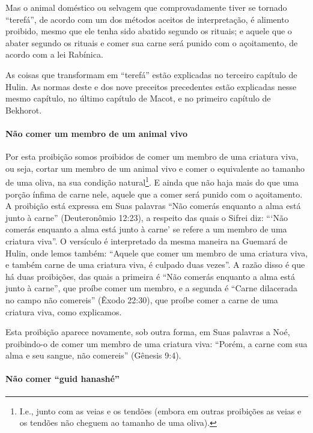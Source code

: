 Mas o animal doméstico ou selvagem que comprovadamente tiver se tornado
``terefá'', de acordo com um dos métodos aceitos de interpretação, é
alimento proibido, mesmo que ele tenha sido abatido segundo os rituais;
e aquele que o abater segundo os rituais e comer sua carne será punido
com o açoitamento, de acordo com a lei Rabínica.

As coisas que transformam em ``terefá'' estão explicadas no terceiro
capítulo de Hulin. As normas deste e dos nove preceitos precedentes
estão explicadas nesse mesmo capítulo, no último capítulo de Macot, e no
primeiro capítulo de Bekhorot.

\paragraph{Não comer um membro de um animal vivo}

Por esta proibição somos proibidos de comer um membro de uma criatura
viva, ou seja, cortar um membro de um animal vivo e comer o equivalente
ao tamanho de uma oliva, na sua condição natural\footnote{I.e., junto com as veias e os tendões (embora em outras proibições as
  veias e os tendões não cheguem ao tamanho de uma oliva).}.
E ainda que não haja mais do que uma porção ínfima de carne nele, aquele
que a comer será punido com o açoitamento. A proibição está expressa em
Suas palavras ``Não comerás enquanto a alma está junto à carne''
(Deuteronômio 12:23), a respeito das quais o Sifrei diz: ```Não comerás
enquanto a alma está junto à carne' se refere a um membro de uma
criatura viva''. O versículo é interpretado da mesma maneira na Guemará
de Hulin, onde lemos também: ``Aquele que comer um membro de uma criatura viva, e também carne de uma criatura
viva, é culpado duas vezes''. A razão disso é que há duas proibições,
das quais a primeira é ``Não comerás enquanto a alma está junto à
carne'', que proíbe comer um membro, e a segunda é ``Carne dilacerada no
campo não comereis'' (Êxodo 22:30), que proíbe comer a carne de uma
criatura viva, como explicamos.

Esta proibição aparece novamente, sob outra forma, em Suas palavras a
Noé, proibindo-o de comer um membro de uma criatura viva: ``Porém, a
carne com sua alma e seu sangue, não comereis'' (Gênesis 9:4).

\paragraph{Não comer ``guid hanashé''}

